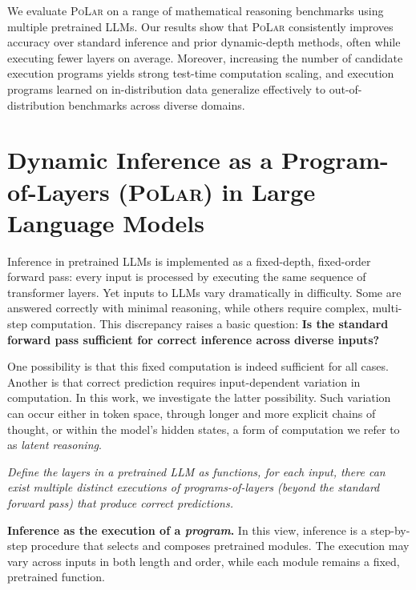 \documentclass{article}
\theoremstyle{plain}
\theoremstyle{definition}
\theoremstyle{remark}
\newcommand\ours{\textsc{PoLar}\xspace}
\begin{document}
We evaluate \ours on a range of mathematical reasoning benchmarks using multiple pretrained LLMs.
Our results show that \ours consistently improves accuracy over standard inference and prior dynamic-depth methods, often while executing fewer layers on average.
Moreover, increasing the number of candidate execution programs yields strong test-time computation scaling, and execution programs learned on in-distribution data generalize effectively to out-of-distribution benchmarks across diverse domains.




\section{Dynamic Inference as a Program-of-Layers (\ours) in Large Language Models}
\label{sec:analysis}

Inference in pretrained LLMs is implemented as a fixed-depth, fixed-order forward pass:
every input is processed by executing the same sequence of transformer layers.
Yet inputs to LLMs vary dramatically in difficulty.
Some are answered correctly with minimal reasoning,
while others require complex, multi-step computation.
This discrepancy raises a basic question:
\textbf{Is the standard forward pass sufficient for correct inference across diverse inputs?}

One possibility is that this fixed computation is indeed sufficient for all cases.
Another is that correct prediction requires input-dependent variation in computation.
In this work, we investigate the latter possibility.
Such variation can occur either in token space, through longer and more explicit chains of thought, or within the model’s hidden states, a form of computation we refer to as \emph{latent reasoning}.
\begin{conjecturebox}
\textit{
Define the layers in a pretrained LLM as functions, for each input, there can exist multiple distinct executions of programs-of-layers (beyond the standard forward pass) that produce correct predictions. 
}
\end{conjecturebox}
\textbf{Inference as the execution of a \emph{program}.}
In this view, inference is a step-by-step procedure that selects and composes pretrained modules.
The execution may vary across inputs in both length and order, while each module remains a fixed, pretrained function.
\end{document}
